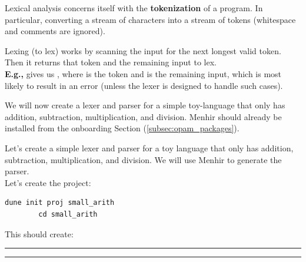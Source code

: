 \begin{Def}

    \label{def:lexical-analysis}
    Lexical analysis concerns itself with the \textbf{tokenization} of a program. In particular, converting a stream 
    of characters into a stream of tokens (whitespace and comments are ignored).

    Lexing (to lex) works by scanning the input for the next longest valid token. Then 
    it returns that token and the remaining input to lex.\\

    \noindent
    \textbf{E.g.,}  gives us , where 
     is the token and  is the remaining input, which is most likely to result in an error 
    (unless the lexer is designed to handle such cases).
\end{Def}

\noindent
We will now create a lexer and parser for a simple toy-language that only has 
addition, subtraction, multiplication, and division.
Menhir should already be installed from the onboarding Section (\ref{subsec:opam_packages}).



\begin{Example}

    \label{ex:lexer-parser}
    Let's create a simple lexer and parser for a toy language that only has addition, subtraction, multiplication, and division.
    We will use Menhir to generate the parser.\\

    \noindent
    Let's create the project: 
    \begin{lstlisting}[numbers=none]
        dune init proj small_arith
        cd small_arith
    \end{lstlisting}

    \noindent
    This should create: \\

    \noindent
    \rule{\textwidth}{0.4pt} 
    \noindent
    \rule{\textwidth}{0.4pt} \\
\end{Example}


